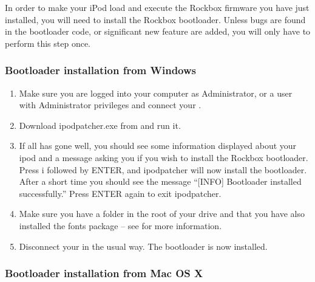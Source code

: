 

In order to make your iPod load and execute the Rockbox firmware you
have just installed, you will need to install the Rockbox
bootloader. Unless bugs are found in the bootloader code, or
significant new feature are added, you will only have to perform this
step once.

\subsubsection{Bootloader installation from Windows}

\begin{enumerate}

\item Make sure you are logged into your computer as Administrator, or a 
user with Administrator privileges and connect your \dap{}.

\item Download ipodpatcher.exe from 
and run it.

\item If all has gone well, you should see some information displayed about
your ipod and a message asking you if you wish to install the Rockbox
bootloader. Press i followed by ENTER, and ipodpatcher will now
install the bootloader. After a short time you should see the message
``[INFO] Bootloader installed successfully.'' Press ENTER again to exit
ipodpatcher.

\item Make sure you have a  folder in the
root of your \daps{} drive and that you have also installed the fonts
package -- see  for more information.

\item Disconnect your \dap{} in the usual way. The bootloader is now installed. 

\end{enumerate}

\subsubsection{Bootloader installation from Mac OS X}

